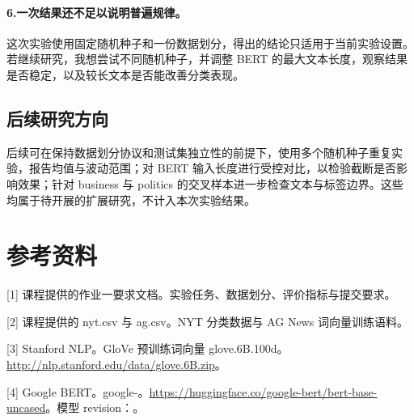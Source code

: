 \documentclass[UTF8,12pt,a4paper,fontset=fandol]{ctexart}
\begin{document}
\paragraph*{6.一次结果还不足以说明普遍规律。}\mbox{}\par\nopagebreak
这次实验使用固定随机种子和一份数据划分，得出的结论只适用于当前实验设置。若继续研究，我想尝试不同随机种子，并调整 BERT 的最大文本长度，观察结果是否稳定，以及较长文本是否能改善分类表现。

\subsection{后续研究方向}
后续可在保持数据划分协议和测试集独立性的前提下，使用多个随机种子重复实验，报告均值与波动范围；对 BERT 输入长度进行受控对比，以检验截断是否影响效果；针对 business 与 politics 的交叉样本进一步检查文本与标签边界。这些均属于待开展的扩展研究，不计入本次实验结果。

\FloatBarrier
\section*{参考资料}
{}
[1] 课程提供的作业一要求文档。实验任务、数据划分、评价指标与提交要求。

[2] 课程提供的 nyt.csv 与 ag.csv。NYT 分类数据与 AG News 词向量训练语料。

[3] Stanford NLP。GloVe 预训练词向量 glove.6B.100d。\url{http://nlp.stanford.edu/data/glove.6B.zip}。

[4] Google BERT。google-。\url{https://huggingface.co/google-bert/bert-base-uncased}。模型 revision：。
\end{document}
